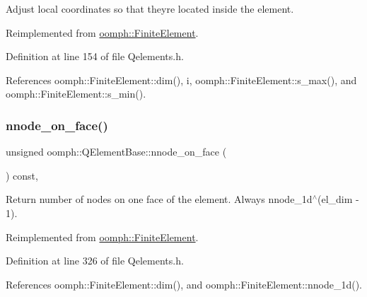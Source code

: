 Adjust local coordinates so that they\textquotesingle{}re located inside the element. 



Reimplemented from \hyperlink{classoomph_1_1FiniteElement_aa042b56813a8dd8ac0e1b19ae2bbe9d1}{oomph\+::\+Finite\+Element}.



Definition at line 154 of file Qelements.\+h.



References oomph\+::\+Finite\+Element\+::dim(), i, oomph\+::\+Finite\+Element\+::s\+\_\+max(), and oomph\+::\+Finite\+Element\+::s\+\_\+min().

\mbox{\label{classoomph_1_1QElementBase_ab5f6a8eda4ea33ebc15b3b5fb623ec80}} 
\subsubsection{\texorpdfstring{nnode\+\_\+on\+\_\+face()}{nnode\_on\_face()}}
{\footnotesize\ttfamily unsigned oomph\+::\+Q\+Element\+Base\+::nnode\+\_\+on\+\_\+face (\begin{DoxyParamCaption}{ }\end{DoxyParamCaption}) const\hspace{0.3cm}{\ttfamily [inline]}, {\ttfamily [virtual]}}

Return number of nodes on one face of the element. Always nnode\+\_\+1d$^\wedge$(el\+\_\+dim -\/ 1). 

Reimplemented from \hyperlink{classoomph_1_1FiniteElement_ad656ea761ed8274eaee9099618a399a2}{oomph\+::\+Finite\+Element}.



Definition at line 326 of file Qelements.\+h.



References oomph\+::\+Finite\+Element\+::dim(), and oomph\+::\+Finite\+Element\+::nnode\+\_\+1d().

\mbox{\label{classoomph_1_1QElementBase_a788011c6b64ed0c6e314b7a1f3165687}} 
